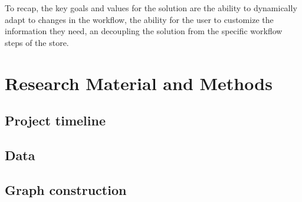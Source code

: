 \documentclass[english,12pt,a4paper,pdftex,sci,utf8]{aaltothesis}
\begin{document}
To recap, the key goals and values for the solution are the ability to dynamically adapt to changes in the workflow,
the ability for the user to customize the information they need, an decoupling the solution from the specific 
workflow steps of the store.


\clearpage
\section{Research Material and Methods}
\label{sec:methods}


\subsection{Project timeline}


\subsection{Data}



\subsection{Graph construction}

\end{document}

